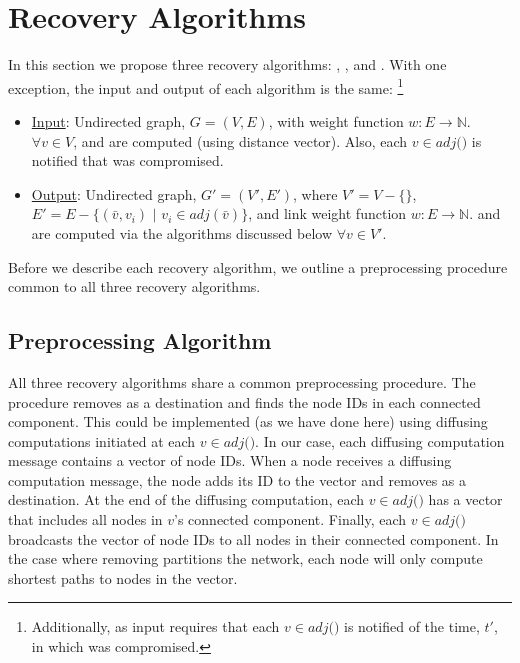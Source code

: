\section{Recovery Algorithms}
\label{sec:algs}

In this section we propose three recovery algorithms: \seconds, \purges, and \cprs.  
With one exception, the input and output of each algorithm is the same: 
{\footnote {\small Additionally, as input \cpr requires that each $v \in adj($\bads$)$ is notified of the time, $t'$, in which \bad was compromised.}}
\begin{itemize}
	\item \underline{Input}:  Undirected graph, $G=(V,E)$, with weight function $w: E \rightarrow \mathbb{N}$.  $\forall v \in V$,  \minv and \dmatrix are computed
(using distance vector). Also, each $v \in adj($\bads$)$ is notified that \bad was compromised.

	\item \underline{Output}: Undirected graph, $G'=(V',E')$, where $V' = V -\{$\bads$\}$, $E'=E - \{(\bar{v},v_i)$ $|$ $v_i \in adj(\bar{v}) \}$,
and link weight function $w:E \rightarrow \mathbb{N}$.  \minvv and \dmatrixv are computed via the algorithms discussed below $\forall  v \in V'$. 
\end{itemize}
Before we describe each recovery algorithm, we outline a preprocessing procedure common to all three recovery algorithms. %


\subsection{Preprocessing Algorithm}
\label{subsec:preprocess}
All three recovery algorithms share a common preprocessing procedure.  The procedure removes \bad as a destination and finds the node IDs in each connected component. 
This could be implemented (as we have done here) using diffusing computations \cite{Dijkstra80} initiated at each $v \in adj($\bads$)$. 
In our case, each diffusing computation message contains a vector of node IDs.  When 
a node receives a diffusing computation message, the node adds its ID to the vector and removes \bad as a destination. At the end of the diffusing computation, 
each $v \in adj($\bads$)$ has a vector that includes all nodes in $v$'s connected component. Finally, each $v \in adj($\bads$)$ broadcasts the vector of node IDs to 
all nodes in their connected component. In the case where removing \bad partitions the network, each node will only compute shortest paths to nodes in the vector. 


